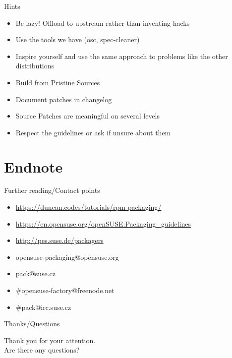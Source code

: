 \documentclass{beamer}
\begin{document}
\begin{frame}[t]{Hints}
	\begin{itemize}
	\item Be lazy! Offload to upstream rather than inventing hacks
    \item Use the tools we have (osc, spec-cleaner)
    \item Inspire yourself and use the same approach to problems like the other distributions
    \item Build from Pristine Sources
    \item Document patches in changelog
    \item Source Patches are meaningful on several levels
    \item Respect the guidelines or ask if unsure about them
	\end{itemize}
\end{frame}

\section{Endnote}

\begin{frame}[t]{Further reading/Contact points}
	\begin{itemize}
	\item \url{https://duncan.codes/tutorials/rpm-packaging/}
	\item \url{https://en.opensuse.org/openSUSE:Packaging\_guidelines}
	\item \url{http://pes.suse.de/packagers}
	\item opensuse-packaging@opensuse.org
	\item pack@suse.cz
	\item \#opensuse-factory@freenode.net 
	\item \#pack@irc.suse.cz
	\end{itemize}
\end{frame}

\begin{frame}{Thanks/Questions}
	\begin{center}
	Thank you for your attention.\\
	Are there any questions?
	\end{center}
\end{frame}
\end{document}
